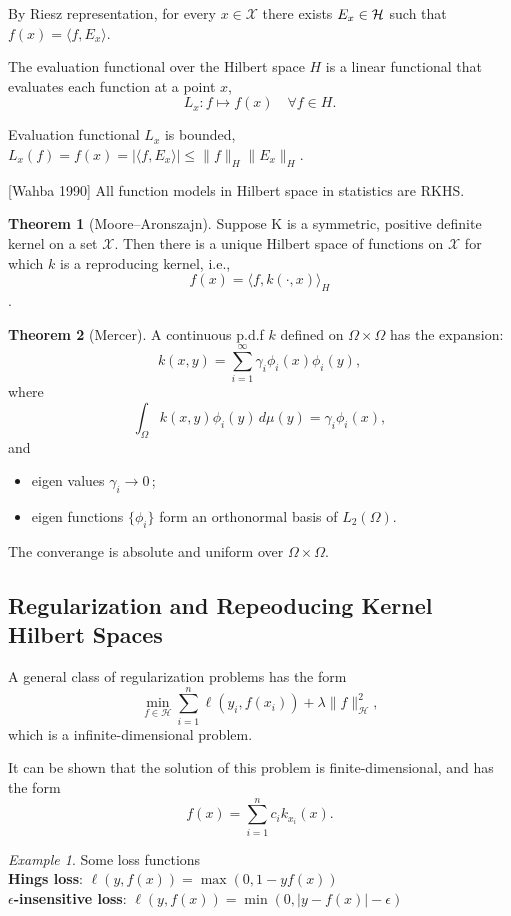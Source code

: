\documentclass[twoside]{article}
\theoremstyle{definition}
\newtheorem{thm}{Theorem}[section]
\theoremstyle{definition}
\theoremstyle{remark}
\newtheorem*{example}{Example}
\def\X{{\mathcal X}}
\def\H{{\cal{H}}}
\begin{document}
By Riesz representation, for every $x\in \X$ there exists $E_x \in \H$ such that $f(x) = \langle f, E_x\rangle$.

The evaluation functional over the Hilbert space $H$ is a linear functional that evaluates each function at a point $x$, 
$$ L_x : f \mapsto f(x) \quad \forall f\in H.$$

Evaluation functional $L_x$ is bounded, $L_x(f) = f(x) = |\langle f,E_x \rangle| \le \|f\|_H\|E_x\|_H$.

[Wahba 1990] All function models in Hilbert space in statistics are RKHS. 

\begin{thm}[Moore–Aronszajn]
Suppose K is a symmetric, positive definite kernel on a set $\mathcal{X}$. Then there is a unique Hilbert space of functions on $\mathcal{X}$ for which $k$ is a reproducing kernel, i.e., 
$$f(x) = \langle f,k(\cdot,x)\rangle _H$$ . 
\end{thm}

\begin{thm}[Mercer]
A continuous p.d.f $k$ defined on $\Omega \times \Omega $ has the expansion: 
$$k(x,y) = \sum\limits_{i = 1} ^\infty \gamma_i \phi_i(x) \phi_i(y) ,$$ 
where 
$$\int_\Omega k(x,y)\phi_i(y)\, \textit{d}\mu(y) = \gamma_i \phi_i(x) ,$$
and 
\begin{itemize}
  \item eigen values $\gamma_i \to 0 \,$;  
  \item eigen functions $\{\phi_i\}$ form an orthonormal basis of $L_2(\Omega)$. 
\end{itemize}
The converange is absolute and uniform over $\Omega\times \Omega$.
\end{thm}



\subsection{Regularization and Repeoducing Kernel Hilbert Spaces}
A general class of regularization problems has the form 
$$\min\limits_{f\in \mathcal{H}} \sum\limits_{i=1}^n \ell(y_i,f(x_i)) +\lambda \|f\|^2_{\mathcal{H}},$$
which is a infinite-dimensional problem. 

It can be shown that the solution of this problem is finite-dimensional, and has the form 
$$ f(x) = \sum\limits_{i=1}^n c_ik_{x_i}(x) .$$

\begin{example} Some loss functions \\
\textbf{Hings loss}: $\ell(y,f(x)) = \max(0, 1-yf(x))$\\
\textbf{ $\epsilon$-insensitive loss}: $\ell(y,f(x)) = \min(0, |y-f(x)|-\epsilon)$
\end{example}
\end{document}
